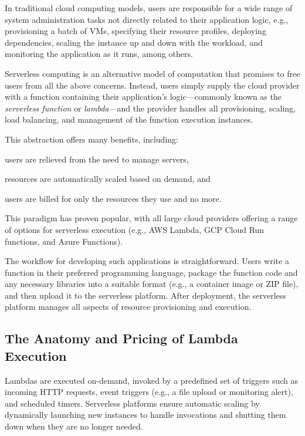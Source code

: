 \documentclass[sigplan,nonacm]{acmart}
\begin{document}
In traditional cloud computing models, users are responsible for a wide range of system administration tasks not directly related to their application logic, e.g., provisioning a batch of VMs, specifying their resource profiles, deploying dependencies, scaling the instance up and down with the workload, and monitoring the application as it runs, among others.

Serverless computing is an alternative model of computation that promises to free users from all the above concerns.
Instead, users simply supply the cloud provider with a function containing their application's logic---commonly known as the \textit{serverless function} or \textit{lambda}---and the provider handles all provisioning, scaling, load balancing, and management of the function execution instances.

This abstraction offers many benefits, including: 
\begin{enumerate*}[label=(\arabic*)]
    \item users are relieved from the need to manage servers,
    \item resources are automatically scaled based on demand, and
    \item users are billed for only the resources they use and no more.
\end{enumerate*}
This paradigm has proven popular, with all large cloud providers offering a range of options for serverless execution (e.g., AWS Lambda, GCP Cloud Run functions, and Azure Functions).


The workflow for developing such applications is straightforward. 
Users write a function in their preferred programming language, package the function code and any necessary libraries into a suitable format (e.g., a container image or ZIP file), and then upload it to the serverless platform.
After deployment, the serverless platform manages all aspects of resource provisioning and execution.

\subsection{The Anatomy and Pricing of Lambda Execution} \label{ssec:anatomy}

Lambdas are executed on-demand, invoked by a predefined set of triggers such as incoming HTTP requests, event triggers (e.g., a file upload or monitoring alert), and scheduled timers.
Serverless platforms ensure automatic scaling by dynamically launching new instances to handle invocations and shutting them down when they are no longer needed.
\end{document}
